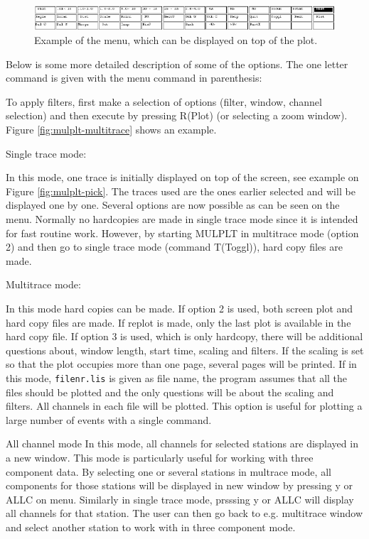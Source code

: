 \begin{figure}
\centerline{\includegraphics[width=0.9\linewidth]{fig/fig21}}
\caption{Example of the menu, which can be displayed on top of the plot.
}
\label{fig:mulplt-menu}
\end{figure}

Below is some more detailed description of some of the options. The one letter command is given 
with the menu command in parenthesis: 

To apply filters, first make a selection of options (filter, window, channel selection) and then execute by pressing R(Plot) (or selecting a zoom window). Figure 
\ref{fig:mulplt-multitrace}
shows an example. 

Single trace mode: 

In this mode, one trace is initially displayed on top of the screen, see example on Figure 
\ref{fig:mulplt-pick}.
The traces used are the ones earlier selected and will be displayed one by one. Several options are now possible as can be seen on the menu. Normally no hardcopies are made in single trace mode since it is intended for fast routine work. However, by starting MULPLT in multitrace mode (option 2) and then go to single trace mode (command T(Toggl)), hard copy files are made. 

Multitrace mode: 

In this mode hard copies can be made. If option 2 is used, both screen plot and hard copy files are made. If replot is made, only the last plot is available in the hard copy file. If option 3 is used, which is only hardcopy, there will be additional questions about, window length, start time, scaling and filters. If the scaling is set so that the plot occupies more than one page, several pages will be printed. If in this mode, \texttt{filenr.lis} is given as file name, the program assumes that all the files should be plotted and the only questions will be about the scaling and filters. All channels in each file will be plotted. This option is useful for plotting a large number of events with a single command. 

All channel mode\newline
In this mode, all channels for selected stations are displayed in a new window. This mode is particularly useful for working with three component data. By selecting one or several stations in multrace mode, all components for those stations will be displayed in new window by pressing y or ALLC on menu. Similarly in single trace mode, prsssing y or ALLC will display all channels for that station. The user can then go back to e.g. multitrace window and select another station to work with in three component mode.
 

